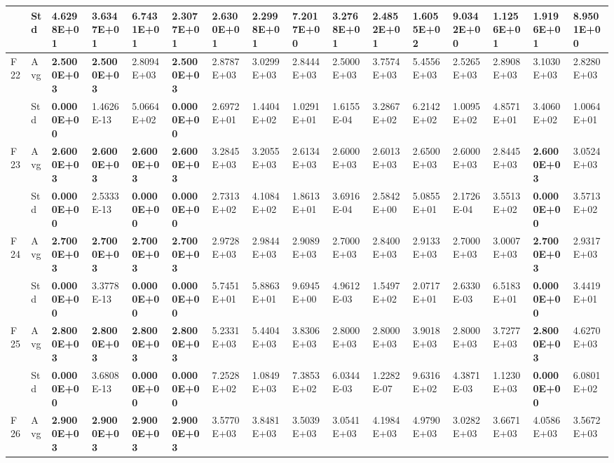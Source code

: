\documentclass{article} %
\begin{document}
\begin{tabular}{|p{0.3in}|p{0.3in}|p{0.3in}|p{0.3in}|p{0.3in}|p{0.3in}|p{0.3in}|p{0.3in}|p{0.3in}|p{0.3in}|p{0.3in}|p{0.3in}|p{0.3in}|p{0.3in}|p{0.3in}|p{0.5in}|}
 & Std & 4.6298E+01 & 3.6347E+01 & 6.7431E+01 & 2.3077E+01 & 2.6300E+01 & 2.2998E+01 & \textbf{7.2017E+00} & 3.2768E+01 & 2.4852E+01 & 1.6055E+02 & 9.0342E+00 & 1.1256E+01 & 1.9196E+01 & 8.9501E+00 \\ \hline 
F22 & Avg & \textbf{2.5000E+03} & \textbf{2.5000E+03} & 2.8094E+03 & \textbf{2.5000E+03} & 2.8787E+03 & 3.0299E+03 & 2.8444E+03 & 2.5000E+03 & 3.7574E+03 & 5.4556E+03 & 2.5265E+03 & 2.8908E+03 & 3.1030E+03 & 2.8280E+03 \\ \hline 
 & Std & \textbf{0.0000E+00} & 1.4626E-13 & 5.0664E+02 & \textbf{0.0000E+00} & 2.6972E+01 & 1.4404E+02 & 1.0291E+01 & 1.6155E-04 & 3.2867E+02 & 6.2142E+02 & 1.0095E+02 & 4.8571E+01 & 3.4060E+02 & 1.0064E+01 \\ \hline 
F23 & Avg & \textbf{2.6000E+03} & \textbf{2.6000E+03} & \textbf{2.6000E+03} & \textbf{2.6000E+03} & 3.2845E+03 & 3.2055E+03 & 2.6134E+03 & 2.6000E+03 & 2.6013E+03 & 2.6500E+03 & 2.6000E+03 & 2.8445E+03 & \textbf{2.6000E+03} & 3.0524E+03 \\ \hline 
 & Std & \textbf{0.0000E+00} & 2.5333E-13 & \textbf{0.0000E+00} & \textbf{0.0000E+00} & 2.7313E+02 & 4.1084E+02 & 1.8613E+01 & 3.6916E-04 & 2.5842E+00 & 5.0855E+01 & 2.1726E-04 & 3.5513E+02 & \textbf{0.0000E+00} & 3.5713E+02 \\ \hline 
F24 & Avg & \textbf{2.7000E+03} & \textbf{2.7000E+03} & \textbf{2.7000E+03} & \textbf{2.7000E+03} & 2.9728E+03 & 2.9844E+03 & 2.9089E+03 & 2.7000E+03 & 2.8400E+03 & 2.9133E+03 & 2.7000E+03 & 3.0007E+03 & \textbf{2.7000E+03} & 2.9317E+03 \\ \hline 
 & Std & \textbf{0.0000E+00} & 3.3778E-13 & \textbf{0.0000E+00} & \textbf{0.0000E+00} & 5.7451E+01 & 5.8863E+01 & 9.6945E+00 & 4.9612E-03 & 1.5497E+02 & 2.0717E+01 & 2.6330E-03 & 6.5183E+01 & \textbf{0.0000E+00} & 3.4419E+01 \\ \hline 
F25 & Avg & \textbf{2.8000E+03} & \textbf{2.8000E+03} & \textbf{2.8000E+03} & \textbf{2.8000E+03} & 5.2331E+03 & 5.4404E+03 & 3.8306E+03 & 2.8000E+03 & 2.8000E+03 & 3.9018E+03 & 2.8000E+03 & 3.7277E+03 & \textbf{2.8000E+03} & 4.6270E+03 \\ \hline 
 & Std & \textbf{0.0000E+00} & 3.6808E-13 & \textbf{0.0000E+00} & \textbf{0.0000E+00} & 7.2528E+02 & 1.0849E+03 & 7.3853E+02 & 6.0344E-03 & 1.2282E-07 & 9.6316E+02 & 4.3871E-03 & 1.1230E+03 & \textbf{0.0000E+00} & 6.0801E+02 \\ \hline 
F26 & Avg & \textbf{2.9000E+03} & \textbf{2.9000E+03} & \textbf{2.9000E+03} & \textbf{2.9000E+03} & 3.5770E+03 & 3.8481E+03 & 3.5039E+03 & 3.0541E+03 & 4.1984E+03 & 4.9790E+03 & 3.0282E+03 & 3.6671E+03 & 4.0586E+03 & 3.5672E+03 \\ \hline 

\end{tabular}
\end{document}
